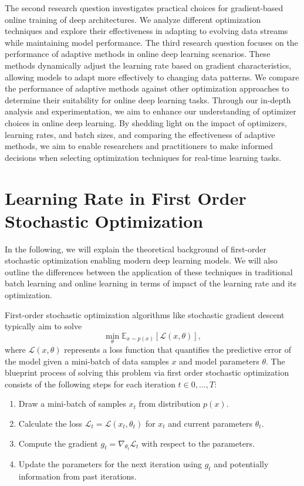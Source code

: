\documentclass[letterpaper]{article} %
\begin{document}
The second research question investigates practical choices for gradient-based online training of deep architectures.
We analyze different optimization techniques and explore their effectiveness in adapting to evolving data streams while maintaining model performance.
The third research question focuses on the performance of adaptive methods in online deep learning scenarios.
These methods dynamically adjust the learning rate based on gradient characteristics, allowing models to adapt more effectively to changing data patterns. We compare the performance of adaptive methods against other optimization approaches to determine their suitability for online deep learning tasks.
Through our in-depth analysis and experimentation, we aim to enhance our understanding of optimizer choices in online deep learning.
By shedding light on the impact of optimizers, learning rates, and batch sizes, and comparing the effectiveness of adaptive methods, we aim to enable researchers and practitioners to make informed decisions when selecting optimization techniques for real-time learning tasks.

\section{Learning Rate in First Order Stochastic Optimization}

In the following, we will explain the theoretical background of first-order stochastic optimization enabling modern deep learning models.
We will also outline the differences between the application of these techniques in traditional batch learning and online learning in terms of impact of the learning rate and its optimization.

First-order stochastic optimization algorithms like stochastic gradient descent typically aim to solve
\begin{equation}
	\min_{\theta} \mathbb{E}_{x \sim p(x)} [\mathcal{L}(x, \theta)],
\end{equation}
where $\mathcal{L}(x, \theta)$ represents a loss function that quantifies the predictive error of the model given a mini-batch of data samples $x$ and model parameters $\theta$.
The blueprint process of solving this problem via first order stochastic optimization consists of the following steps for each iteration $t \in 0, \ldots, T$:
\begin{enumerate}
	\item Draw a mini-batch of samples $x_t$ from distribution $p(x)$.
	\item Calculate the loss $\mathcal{L}_t = \mathcal{L}(x_t, \theta_t)$ for $x_t$ and current parameters $\theta_t$.
	\item Compute the gradient $g_t = \nabla_{\theta_t} \mathcal{L}_t$ with respect to the parameters.
	\item Update the parameters for the next iteration using $g_t$ and potentially information from past iterations.
\end{enumerate}
\end{document}
